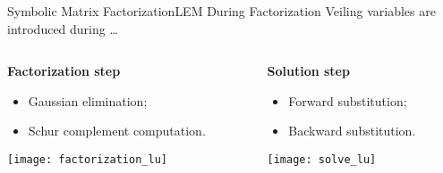 \begin{frame}{Symbolic Matrix Factorization}{\ac{LEM} During Factorization}
  Veiling variables are introduced during \dots \\[1.0em]
  \begin{columns}
    \begin{column}[t]{0.5\textwidth}
      \textbf{Factorization step} \\
      \begin{itemize}\small
        \item Gaussian elimination;
        \item Schur complement computation.
      \end{itemize}
      {\centering \texttt{[image: factorization\_lu]}}
    \end{column}
    \begin{column}[t]{0.5\textwidth}
      \textbf{Solution step} \\
      \begin{itemize}\small
        \item Forward substitution;
        \item Backward substitution.
      \end{itemize}
      {\centering \texttt{[image: solve\_lu]}}
    \end{column}
  \end{columns}
\end{frame}

